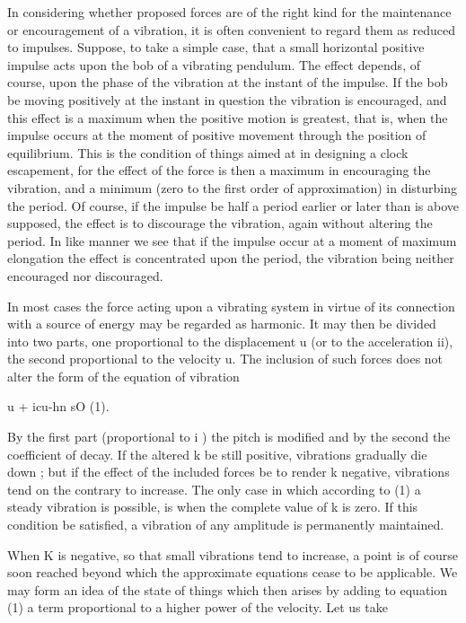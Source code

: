 In considering whether proposed forces are of the right kind for the
maintenance or encouragement of a vibration, it is often convenient to
regard them as reduced to impulses. Suppose, to take a simple case, that
a small horizontal positive impulse acts upon the bob of a vibrating
pendulum. The effect depends, of course, upon the phase of the vibration
at the instant of the impulse. If the bob be moving positively at the
instant in question the vibration is encouraged, and this effect is a
maximum when the positive motion is greatest, that is, when the impulse
occurs at the moment of positive movement through the position of
equilibrium. This is the condition of things aimed at in designing a clock
escapement, for the effect of the force is then a maximum in encouraging
the vibration, and a minimum (zero to the first order of approximation)
in disturbing the period. Of course, if the impulse be half a period earlier or
later than is above supposed, the effect is to discourage the vibration, again
without altering the period. In like manner we see that if the impulse occur at
a moment of maximum elongation the effect is concentrated upon the period, the
vibration being neither encouraged nor discouraged.

In most cases the force acting upon a vibrating system in virtue of its
connection with a source of energy may be regarded as harmonic. It may
then be divided into two parts, one proportional to the displacement u
(or to the acceleration ii), the second proportional to the velocity u.
The inclusion of such forces does not alter the form of the equation of
vibration

u + icu-hn sO (1).

By the first part (proportional to i ) the pitch is modified and by the
second the coefficient of decay. If the altered k be still positive,
vibrations gradually die down ; but if the effect of the included forces
be to render k negative, vibrations tend on the contrary to increase.
The only case in which according to (1) a steady vibration is possible,
is when the complete value of k is zero. If this condition be satisfied,
a vibration of any amplitude is permanently maintained.

When K is negative, so that small vibrations tend to increase, a point
is of course soon reached beyond which the approximate equations cease
to be applicable. We may form an idea of the state of things which then
arises by adding to equation (1) a term proportional to a higher power
of the velocity. Let us take

